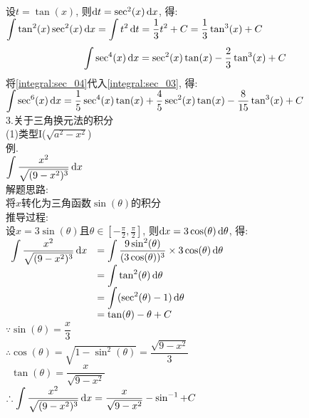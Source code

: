 设$t=\tan(x)$, 则$\mathop{}\!\mathrm{d} t=\sec^2(x)\mathop{}\!\mathrm{d} x$, 得:\\
$\displaystyle\int\tan^2(x)\sec^2(x)\mathop{}\!\mathrm{d} x=\int t^2\mathop{}\!\mathrm{d} t=\dfrac{1}{3}t^2+C=\dfrac{1}{3}\tan^3(x)+C$\\[1ex]
\begin{equation}
\displaystyle\int\sec^4(x)\mathop{}\!\mathrm{d} x=\sec^2(x)\tan(x)-\dfrac{2}{3}\tan^3(x)+C\label{integral:sec_04}
\end{equation}
将\eqref{integral:sec_04}代入\eqref{integral:sec_03}, 得:\\
$\displaystyle\int\sec^6(x)\mathop{}\!\mathrm{d} x=\frac{1}{5}\sec^4(x)\tan(x)+\frac{4}{5}\sec^2(x)\tan(x)-\frac{8}{15}\tan^3(x)+C$\\[4ex]

3.关于三角换元法的积分\\
(1)类型I($\sqrt{a^2-x^2}$)\\
例.\\
$\displaystyle\int\frac{x^2}{\sqrt{(9-x^2)^3}}\mathop{}\!\mathrm{d} x$\\
解题思路:\\
将$x$转化为三角函数$\sin(\theta)$的积分\\
推导过程:\\
设$x=3\sin(\theta)$且$\theta\in[-\frac{\pi}{2},\frac{\pi}{2}]$, 则$\mathop{}\!\mathrm{d} x=3\cos(\theta)\mathop{}\!\mathrm{d}\theta$, 得:\\
$\begin{array}{>{\displaystyle}r >{\displaystyle}l}
\int\frac{x^2}{\sqrt{(9-x^2)^3}}\dif x & =\int\frac{9\sin^2(\theta)}{(3\cos(\theta))^3}\times 3\cos(\theta)\dif\theta\\
& =\int\tan^2(\theta)\dif\theta\\
& =\int(\sec^2(\theta)-1)\dif\theta\\
& =\tan(\theta)-\theta+C
\end{array}$\\
$\because\sin(\theta)=\dfrac{x}{3}$\\
$\therefore\cos(\theta)=\sqrt{1-\sin^2(\theta)}=\dfrac{\sqrt{9-x^2}}{3}$\\
$\phantom{\therefore}\tan(\theta)=\dfrac{x}{\sqrt{9-x^2}}$\\
$\displaystyle\therefore\int\frac{x^2}{\sqrt{(9-x^2)^3}}\mathop{}\!\mathrm{d} x=\frac{x}{\sqrt{9-x^2}}-\sin^{-1}+C$\\[2ex]

